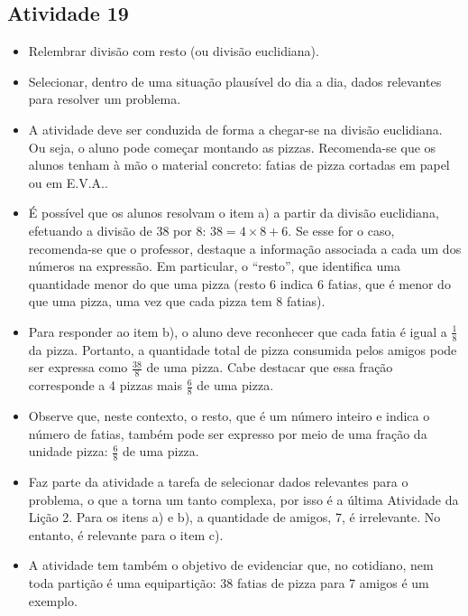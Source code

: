 \begin{multicols}{2}
\subsection{Atividade 19}

 \vspace{.1cm}

\begin{itemize} %
    \item       Relembrar divisão com resto (ou divisão euclidiana).
    \item       Selecionar, dentro de uma situação plausível do dia a dia, dados relevantes para resolver um problema.
\end{itemize} %
\vspace{.1cm}


  \vspace{.1cm}

  \vspace{.1cm}

\begin{itemize} %
    \item       A atividade deve ser conduzida de forma a chegar-se na divisão euclidiana. Ou seja, o aluno pode começar montando as pizzas. Recomenda-se que os alunos tenham à mão o material concreto: fatias de pizza cortadas em papel ou em E.V.A..
    \item       É possível que os alunos resolvam o item a) a partir da divisão euclidiana, efetuando a divisão de 38 por 8: $38 = 4 \times 8 + 6$. Se esse for o caso, recomenda-se que o professor, destaque a informação associada a cada um dos números na expressão. Em particular, o       ``resto'', que identifica uma quantidade menor do que uma pizza (resto 6 indica 6 fatias, que é menor do que uma pizza, uma vez que cada pizza tem 8 fatias).
    \item       Para responder ao item b), o aluno deve reconhecer que cada fatia é igual a       $\frac{1}{8}$ da pizza. Portanto, a quantidade total de pizza consumida pelos amigos pode ser expressa como       $\frac{38}{8}$ de uma pizza. Cabe destacar que essa fração corresponde a 4 pizzas mais $\frac{6}{8}$ de uma pizza.
    \item        Observe que, neste contexto, o resto, que é um número inteiro e indica o número de fatias, também pode ser expresso por meio de uma fração da unidade pizza:       $\frac{6}{8}$ de uma pizza.
    \item       Faz parte da atividade a tarefa de selecionar dados relevantes para o problema, o que a torna um tanto complexa, por isso é a última Atividade da Lição 2. Para os itens a) e b), a quantidade de amigos, 7, é irrelevante. No entanto, é relevante para o item c).
    \item       A atividade tem também o objetivo de evidenciar que, no cotidiano, nem toda partição é uma equipartição: 38 fatias de pizza para 7 amigos é um exemplo.
\end{itemize} %


\end{multicols}

